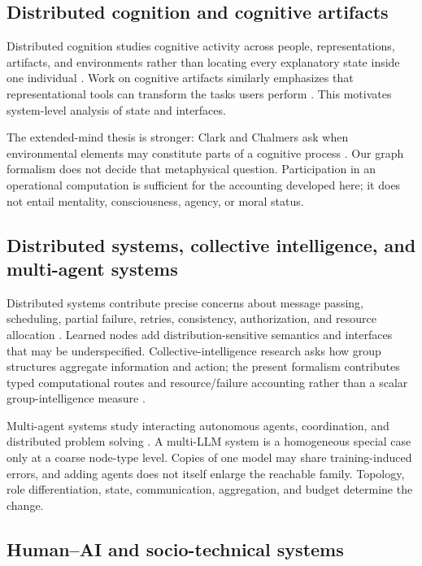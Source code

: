\documentclass[10pt]{article}
\begin{document}
\subsection{Distributed cognition and cognitive artifacts}

Distributed cognition studies cognitive activity across people, representations, artifacts, and environments rather than locating every explanatory state inside one individual \cite{hutchins1995}. Work on cognitive artifacts similarly emphasizes that representational tools can transform the tasks users perform \cite{norman1991}. This motivates system-level analysis of state and interfaces.

The extended-mind thesis is stronger: Clark and Chalmers ask when environmental elements may constitute parts of a cognitive process \cite{clark1998}. Our graph formalism does not decide that metaphysical question. Participation in an operational computation is sufficient for the accounting developed here; it does not entail mentality, consciousness, agency, or moral status.

\subsection{Distributed systems, collective intelligence, and multi-agent systems}

Distributed systems contribute precise concerns about message passing, scheduling, partial failure, retries, consistency, authorization, and resource allocation \cite{tanenbaum2017}. Learned nodes add distribution-sensitive semantics and interfaces that may be underspecified. Collective-intelligence research asks how group structures aggregate information and action; the present formalism contributes typed computational routes and resource/failure accounting rather than a scalar group-intelligence measure \cite{malone2015}.

Multi-agent systems study interacting autonomous agents, coordination, and distributed problem solving \cite{wooldridge2009}. A multi-LLM system is a homogeneous special case only at a coarse node-type level. Copies of one model may share training-induced errors, and adding agents does not itself enlarge the reachable family. Topology, role differentiation, state, communication, aggregation, and budget determine the change.

\subsection{Human--AI and socio-technical systems}
\end{document}
